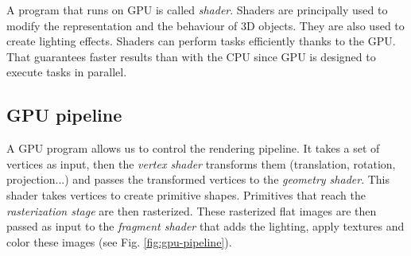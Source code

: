 A program that runs on GPU is called \textit{shader}. Shaders are principally used to modify the representation and the behaviour of 3D objects. They are also used to create lighting effects. Shaders can perform tasks efficiently thanks to the GPU. That guarantees faster results than with the CPU since GPU is designed to execute tasks in parallel.

\subsection{GPU pipeline}
A GPU program allows us to control the rendering pipeline. It takes a set of vertices as input, then the \textit{vertex shader} transforms them (translation, rotation, projection...) and passes the transformed vertices to the \textit{geometry shader}. This shader takes vertices to create primitive shapes. Primitives that reach the \textit{rasterization stage} are then rasterized. These rasterized flat images are then passed as input to the \textit{fragment shader} that adds the lighting, apply textures and color these images (see Fig. \ref{fig:gpu-pipeline}).


